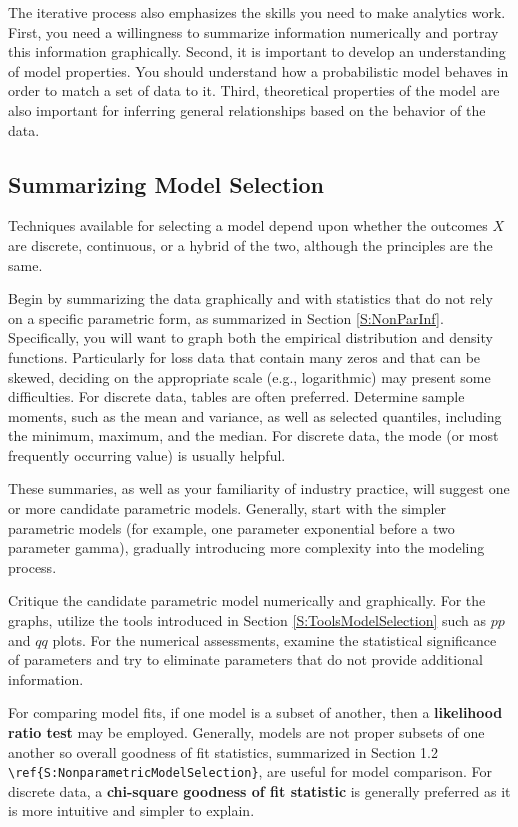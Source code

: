 \documentclass[]{book}
\theoremstyle{definition}
\theoremstyle{definition}
\theoremstyle{definition}
\theoremstyle{remark}
\begin{document}
The iterative process also emphasizes the skills you need to make
analytics work. First, you need a willingness to summarize information
numerically and portray this information graphically. Second, it is
important to develop an understanding of model properties. You should
understand how a probabilistic model behaves in order to match a set of
data to it. Third, theoretical properties of the model are also
important for inferring general relationships based on the behavior of
the data.

\subsection{Summarizing Model
Selection}\label{summarizing-model-selection}

Techniques available for selecting a model depend upon whether the
outcomes \(X\) are discrete, continuous, or a hybrid of the two,
although the principles are the same.

Begin by summarizing the data graphically and with statistics that do
not rely on a specific parametric form, as summarized in Section
\ref{S:NonParInf}. Specifically, you will want to graph both the
empirical distribution and density functions. Particularly for loss data
that contain many zeros and that can be skewed, deciding on the
appropriate scale (e.g., logarithmic) may present some difficulties. For
discrete data, tables are often preferred. Determine sample moments,
such as the mean and variance, as well as selected quantiles, including
the minimum, maximum, and the median. For discrete data, the mode (or
most frequently occurring value) is usually helpful.

These summaries, as well as your familiarity of industry practice, will
suggest one or more candidate parametric models. Generally, start with
the simpler parametric models (for example, one parameter exponential
before a two parameter gamma), gradually introducing more complexity
into the modeling process.

Critique the candidate parametric model numerically and graphically. For
the graphs, utilize the tools introduced in Section
\ref{S:ToolsModelSelection} such as \(pp\) and \(qq\) plots. For the
numerical assessments, examine the statistical significance of
parameters and try to eliminate parameters that do not provide
additional information.

For comparing model fits, if one model is a subset of another, then a
\textbf{likelihood ratio test} may be employed. Generally, models are
not proper subsets of one another so overall goodness of fit statistics,
summarized in Section 1.2
\texttt{\textbackslash{}ref\{S:NonparametricModelSelection\}}, are
useful for model comparison. For discrete data, a \textbf{chi-square
goodness of fit statistic} is generally preferred as it is more
intuitive and simpler to explain.
\end{document}
